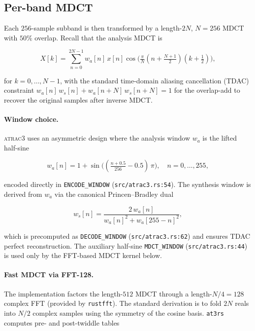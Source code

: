 \documentclass[11pt]{article}
\begin{document}
\subsection{Per-band MDCT}

Each \(256\)-sample subband is then transformed by a length-\(2N\), \(N{=}256\)
MDCT with \(50\%\) overlap. Recall that the analysis MDCT is

\begin{equation}
    X[k] = \!\!\sum_{n=0}^{2N-1}\!\! w_a[n]\,x[n]\cos\!\Big(\tfrac{\pi}{N}(n{+}\tfrac{N{+}1}{2})(k{+}\tfrac{1}{2})\Big),
\end{equation}

\noindent
for \(k = 0,\dots,N-1\), with the standard time-domain aliasing cancellation
(TDAC) constraint \(w_a[n]\,w_s[n] + w_a[n{+}N]\,w_s[n{+}N] = 1\) for the
overlap-add to recover the original samples after inverse MDCT.

\paragraph{Window choice.}
\textsc{atrac3} uses an asymmetric design where the analysis window
\(w_a\) is the lifted half-sine

\begin{equation}
    w_a[n] = 1 + \sin\!\Big((\tfrac{n+0.5}{256} - 0.5)\,\pi\Big), \quad n=0,\dots,255,
    \label{eq:enc_window}
\end{equation}

\noindent
encoded directly in \texttt{ENCODE\_WINDOW}
(\texttt{src/atrac3.rs:54}). The synthesis window is derived from
\(w_a\) via the canonical Princen--Bradley dual

\begin{equation}
    w_s[n] = \frac{2\,w_a[n]}{w_a[n]^2 + w_a[255-n]^2},
    \label{eq:dec_window}
\end{equation}

\noindent
which is precomputed as \texttt{DECODE\_WINDOW}
(\texttt{src/atrac3.rs:62}) and ensures TDAC perfect reconstruction. The
auxiliary half-sine \texttt{MDCT\_WINDOW} (\texttt{src/atrac3.rs:44}) is
used only by the FFT-based MDCT kernel below.

\paragraph{Fast MDCT via FFT-128.}
The implementation factors the length-\(512\) MDCT through a length-\(N/4 =
128\) complex FFT (provided by \texttt{rustfft}). The standard derivation
is to fold \(2N\) reals into \(N/2\) complex samples using the symmetry of
the cosine basis. \texttt{at3rs} computes pre- and post-twiddle tables
\end{document}
